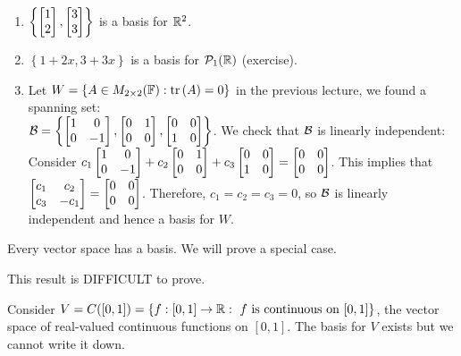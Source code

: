 \begin{example}
    \phantom{}
    \begin{enumerate}
        \item $\left\{  \begin{bmatrix} 1 \\ 2 \end{bmatrix}, \begin{bmatrix} 3 \\ 3 \end{bmatrix} \right\}$ is a basis for ${\mathbb{R}}^2$.
        \item $\left\{  1+2x, 3+3x \right\}$ is a basis for $\mathcal{P}_1({\mathbb{R}})$ (exercise).
        \item Let $W = \left\{  A \in M_{2 \times 2}({\mathbb{F}}): \operatorname{tr}{(A)} = 0 \right\}$ in the previous lecture,
        we found a spanning set: \vspace{1mm} \\
        $\mathcal{B} = \left\{\begin{bmatrix} 1 & 0 \\ 0 & -1 \end{bmatrix}, \begin{bmatrix} 0 & 1 \\ 0 & 0 \end{bmatrix}, \begin{bmatrix} 0 & 0 \\ 1 & 0 \end{bmatrix}\right\}$.
        We check that $\mathcal{B}$ is linearly independent: \vspace{1mm} \\
        Consider $c_1\begin{bmatrix} 1 & 0 \\ 0 & -1 \end{bmatrix} + c_2\begin{bmatrix} 0 & 1 \\ 0 & 0 \end{bmatrix} + c_3\begin{bmatrix} 0 & 0 \\ 1 & 0 \end{bmatrix} = \begin{bmatrix} 0 & 0 \\ 0 & 0 \end{bmatrix}$.
        This implies that \\ $\begin{bmatrix} c_1 & c_2 \\ c_3 & -c_1 \end{bmatrix} = \begin{bmatrix} 0 & 0 \\ 0 & 0 \end{bmatrix}$. Therefore, $c_1=c_2=c_3=0$, so $\mathcal{B}$ is linearly independent and hence \vspace{1mm}
        a basis for $W$.
    \end{enumerate}
\end{example}

\begin{theorem}
    Every vector space has a basis. We will prove a special case.
\end{theorem}

\begin{remark}
    This result is DIFFICULT to prove.
\end{remark}

\begin{example}
    Consider $V = C([0,1]) = \left\{  f: [0,1] \to {\mathbb{R}}: \text{ $f$ is continuous on $[0,1]$} \right\}$, the vector space of real-valued continuous functions on $[0,1]$. The basis for $V$ exists but we cannot write it down.
\end{example}

